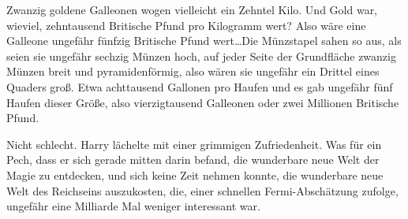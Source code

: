 Zwanzig goldene Galleonen wogen vielleicht ein Zehntel Kilo. Und Gold war, wieviel, zehntausend Britische Pfund pro Kilogramm wert? Also wäre eine Galleone ungefähr fünfzig Britische Pfund wert…Die Münzstapel sahen so aus, als seien sie ungefähr sechzig Münzen hoch, auf jeder Seite der Grundfläche zwanzig Münzen breit und pyramidenförmig, also wären sie ungefähr ein Drittel eines Quaders groß. Etwa achttausend Gallonen pro Haufen und es gab ungefähr fünf Haufen dieser Größe, also vierzigtausend Galleonen oder zwei Millionen Britische Pfund.

Nicht schlecht. Harry lächelte mit einer grimmigen Zufriedenheit. Was für ein Pech, dass er sich gerade mitten darin befand, die wunderbare neue Welt der Magie zu entdecken, und sich keine Zeit nehmen konnte, die wunderbare neue Welt des Reichseins auszukosten, die, einer schnellen Fermi-Abschätzung zufolge, ungefähr eine Milliarde Mal weniger interessant war.

